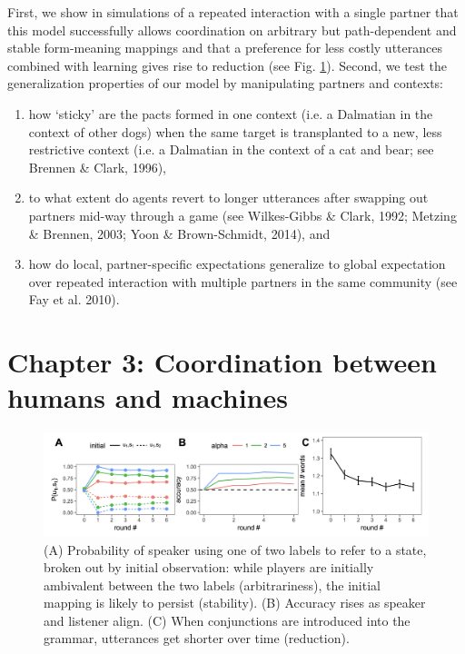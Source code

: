 \documentclass[11pt]{article}
\begin{document}
First, we show in simulations of a repeated interaction with a single partner that this model successfully allows coordination on arbitrary but path-dependent and stable form-meaning mappings and that a preference for less costly utterances combined with learning gives rise to reduction (see Fig. \ref{fig:modelresults}). Second, we test the generalization properties of our model by manipulating partners and contexts: 
\begin{enumerate}
\item how `sticky' are the pacts formed in one context (i.e. a Dalmatian in the context of other dogs) when the same target is transplanted to a new, less restrictive context (i.e. a Dalmatian in the context of a cat and bear; see Brennen \& Clark, 1996), 
\item to what extent do agents revert to longer utterances after swapping out partners mid-way through a game (see  Wilkes-Gibbs \& Clark, 1992; Metzing \& Brennen, 2003; Yoon \& Brown-Schmidt, 2014), and 
\item how do local, partner-specific expectations generalize to global expectation over repeated interaction with multiple partners in the same community (see Fay et al. 2010).
\end{enumerate}

\section*{Chapter 3: Coordination between humans and machines}

\begin{figure}[t]
\centering
\includegraphics[scale=.36]{model_results.png}
\caption{ (A) Probability of speaker using one of two labels to refer to a state, broken out by initial observation: while players are initially ambivalent between the two labels (arbitrariness), the initial mapping is likely to persist (stability). (B) Accuracy rises as speaker and listener align. (C) When conjunctions are introduced into the grammar, utterances get shorter over time (reduction).}
\label{fig:modelresults}
\end{figure}
\end{document}
